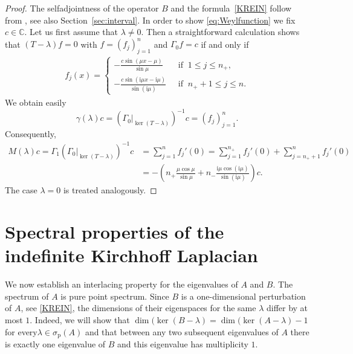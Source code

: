 \documentclass{article}
\numberwithin{equation}{section}
\theoremstyle{definition}
\newcommand{\C}{\mathbb{C}}
\newcommand{\I}{\mathrm i} %
\newcommand{\pointspec}{\sigma_{\mathrm p}}
\newcommand{\AKone}{B}
\newcommand{\TK}{T}
\newcommand{\MK}{M}
\newcommand{\gammaK}{\gamma}
\begin{document}
\begin{proof}
   The selfadjointness of the operator $B$ and the formula~\eqref{KREIN} follow from \cite{D95}, see also Section~\ref{sec:interval}.
   In order to show \eqref{eq:Weylfunction} we fix $c\in\C$. Let us first assume that $\lambda\neq 0$. Then a straightforward calculation shows that $(\TK - \lambda)f = 0$ with $f = (f_j)_{j=1}^n$ and $\Gamma_0f = c$ if and only if 
   \begin{align*}
   	f_j(x) = 
   	\begin{cases}
   		- \frac{c \sin(\mu x - \mu)}{\sin\mu}\quad &\text{if }\ 1 \le j \le n_+,\\[1ex]
   		- \frac{c \sin(\I\mu x - \I\mu)}{\sin(\I\mu)} &\text{if }\ n_+ + 1 \le j \le n.
   	\end{cases}
   \end{align*}
   We obtain easily 
   \begin{equation*}
      \gammaK(\lambda) c =
      (\Gamma_0|_{\ker(T - \lambda)})^{-1} c = (f_j)_{j=1}^n.
   \end{equation*}
   Consequently,
   \begin{align*}
   	\MK(\lambda)c = \Gamma_1 (\Gamma_0|_{\ker(T-\lambda)})^{-1} c & = \sum_{j=1}^n f_j'(0) = \sum_{j=1}^{n_+} f_j'(0)+ \sum_{j = n_+ + 1}^n f_j'(0)\\
   	& = -\left( n_+ \frac{ \mu\cos\mu}{\sin\mu} + n_- \frac{ \I\mu \cos(\I\mu)}{\sin(\I\mu)}\right) c.
   \end{align*}
   The case $\lambda = 0$ is treated analogously.
\end{proof}


\section{Spectral properties of the indefinite Kirchhoff Laplacian %
} \label{spectrum}

We now establish an interlacing property for the eigenvalues of $A$ and $B$. 
The spectrum of $A$ is pure point spectrum.
Since $B$ is a one-dimensional perturbation of $A$, see \eqref{KREIN},
the dimensions of their eigenspaces for the same $\lambda$ differ by at most $1$.
Indeed, we will show that 
$\dim(\ker(B-\lambda) = \dim(\ker(A-\lambda) - 1$ for every$\lambda\in \pointspec(A)$ and that between any two subsequent eigenvalues of $A$ there is exactly one eigenvalue of $B$ and this eigenvalue has multiplicity $1$.
\end{document}
